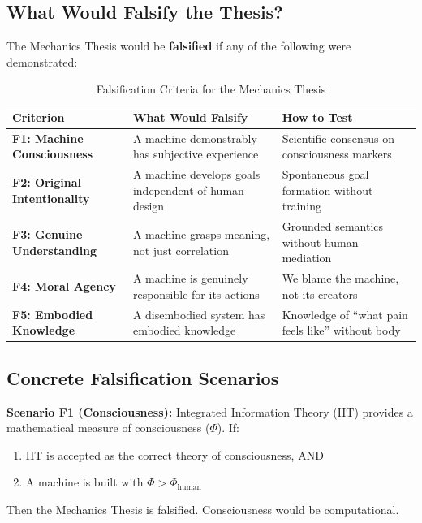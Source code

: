 \subsection{What Would Falsify the Thesis?}

The Mechanics Thesis would be \textbf{falsified} if any of the following were demonstrated:

\begin{table}[htbp]
\centering
\caption{Falsification Criteria for the Mechanics Thesis}
\label{tab:hi-falsification}
\renewcommand{\arraystretch}{1.5}
\begin{tabular}{@{}p{3.5cm}p{5cm}p{4cm}@{}}
\toprule
\textbf{Criterion} & \textbf{What Would Falsify} & \textbf{How to Test} \\
\midrule
\textbf{F1: Machine Consciousness} & A machine demonstrably has subjective experience & Scientific consensus on consciousness markers \\
\textbf{F2: Original Intentionality} & A machine develops goals independent of human design & Spontaneous goal formation without training \\
\textbf{F3: Genuine Understanding} & A machine grasps meaning, not just correlation & Grounded semantics without human mediation \\
\textbf{F4: Moral Agency} & A machine is genuinely responsible for its actions & We blame the machine, not its creators \\
\textbf{F5: Embodied Knowledge} & A disembodied system has embodied knowledge & Knowledge of ``what pain feels like'' without body \\
\bottomrule
\end{tabular}
\end{table}

\subsection{Concrete Falsification Scenarios}

\textbf{Scenario F1 (Consciousness):} Integrated Information Theory (IIT) provides a mathematical measure of consciousness ($\Phi$). If:
\begin{enumerate}
    \item IIT is accepted as the correct theory of consciousness, AND
    \item A machine is built with $\Phi > \Phi_{\text{human}}$
\end{enumerate}
Then the Mechanics Thesis is falsified. Consciousness would be computational.

